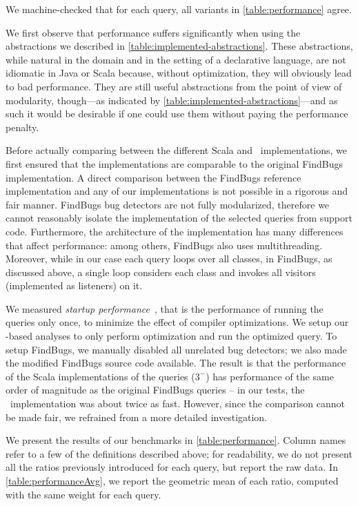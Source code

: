  We machine-checked that for each query, all variants in \cref{table:performance} agree.

We first observe that performance suffers significantly when using the abstractions we described in \cref{table:implemented-abstractions}. These abstractions, while natural in the domain and in the setting of a declarative language, are not idiomatic in Java or Scala because, without optimization, they
will obviously lead to bad performance. They are still useful abstractions from the point of view of modularity, though---as indicated by \cref{table:implemented-abstractions}---and as such it would be desirable if one could use them without paying the performance penalty.


Before actually comparing between the different Scala and \LoS\ implementations, we first ensured that the implementations are comparable to the original FindBugs implementation. A direct comparison between the FindBugs reference implementation and any of our implementations is not possible in a rigorous and fair manner. FindBugs bug detectors are not fully modularized, therefore we cannot reasonably isolate the implementation of the selected queries from support code. Furthermore, the architecture of the implementation has many differences that affect performance: among others, FindBugs also uses multithreading. Moreover, while in our case each query loops over all classes, in FindBugs, as discussed above, a single loop considers each class and invokes all visitors (implemented as listeners) on it.

We measured \emph{startup performance}~\citep{Georges07rigorousJavaPerformance}, that is the performance of running the queries only once, to minimize the effect of compiler optimizations.
We setup our \LoS-based analyses to only perform optimization and run the optimized query. To setup FindBugs, we manually disabled all unrelated bug detectors; we also made the modified FindBugs source code available. The result is that the performance of the Scala implementations of the queries ($3^-$) has performance of the same order of magnitude as the original FindBugs queries -- in our tests, the \LoS\ implementation was about twice as fast. However, since the comparison cannot be made fair, we refrained from a more detailed investigation.

We present the results of our benchmarks in \cref{table:performance}.
Column names refer to a few of the definitions described above; for readability, we do not present all the ratios previously introduced for each query, but report the raw data.
In \cref{table:performanceAvg}, we report the geometric mean \cite{Fleming86} of each ratio, computed with the same weight for each query.

